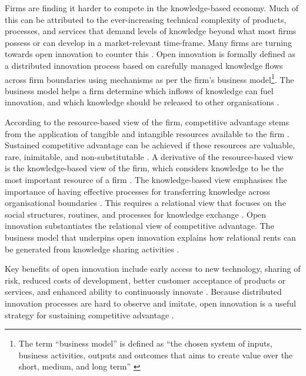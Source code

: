 Firms are finding it harder to compete in the knowledge-based economy. Much of this can be attributed to the ever-increasing technical complexity of products, processes, and services that demand levels of knowledge beyond what most firms possess or can develop in a market-relevant time-frame. Many firms are turning towards open innovation to counter this \citep{enkel2009open,bessant2013innovation,stanko2017under}. Open innovation is formally defined as a distributed innovation process based on carefully managed knowledge flows across firm boundaries using mechanisms as per the firm's business model\footnote{The term \enquote{business model} is defined as \enquote{the chosen system of inputs, business activities, outputs and outcomes that aims to create value over the short, medium, and long term} \citep{gould2013business}}. The business model helps a firm determine which inflows of knowledge can fuel innovation, and which knowledge should be released to other organisations \citep{chesbrough2017future}. \medskip 

According to the resource-based view of the firm, competitive advantage stems from the application of tangible and intangible resources available to the firm \citep{wernerfelt1984resource,peteraf1993cornerstones}. Sustained competitive advantage can be achieved if these resources are valuable, rare, inimitable, and non-substitutable \citep{barney1991firm}. A derivative of the resource-based view is the knowledge-based view of the firm, which considers knowledge to be the most important resource of a firm \citep{grant1996toward}. The knowledge-based view emphasises the importance of having effective processes for transferring knowledge across organisational boundaries \citep{kogut1992knowledge,grant1996toward}. This requires a relational view that focuses on the social structures, routines, and processes for knowledge exchange \citep{dyer1998relational,nahapiet1998social}. Open innovation substantiates the relational view of competitive advantage. The business model that underpins open innovation explains how relational rents can be generated from knowledge sharing activities \citep{durst2013success}. \medskip

Key benefits of open innovation include early access to new technology, sharing of risk, reduced costs of development, better customer acceptance of products or services, and enhanced ability to continuously innovate \citep{ye2013exploring}. Because distributed innovation processes are hard to observe and imitate, open innovation is a useful strategy for sustaining competitive advantage \citep{barney1991firm,lichtenthaler2011open}. \medskip

